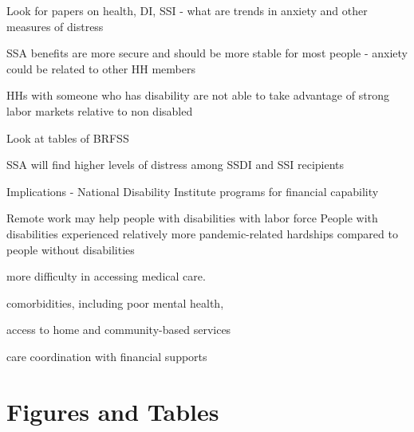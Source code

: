 \documentclass[12pt]{article}
\begin{document}
Look for papers on health, DI, SSI - what are trends in anxiety and other measures of distress

SSA benefits are more secure and should  be more stable for most people  - anxiety could be related to other HH members

HHs with someone who has disability are not able to take advantage of strong labor markets relative to non disabled

Look at tables of BRFSS

\cite{blanchflower2022covid}

SSA will find higher levels of distress among SSDI and SSI recipients 

Implications - National Disability Institute programs for financial capability


\cite{kruse2022disability}
Remote work may help people with disabilities with labor force
People with disabilities experienced relatively more pandemic-related hardships compared to people without disabilities

more difficulty in accessing medical care.

comorbidities, including poor mental health,

access to home and community-based services 

 care coordination  with financial supports
 
 \cite{mitra2022advancing}
 

\section{Figures and Tables}
 
\end{document}
